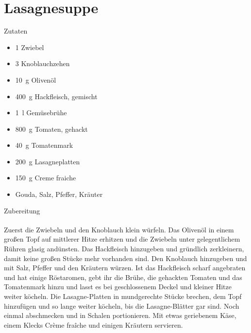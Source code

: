 \section*{Lasagnesuppe}
\ihead{}\ohead{}
\cfoot{}
{\Large Zutaten}
\begin{multicols}{2}
\begin{itemize}
    \item \num{1} Zwiebel 
    \item \num{3} Knoblauchzehen
    \item \SI{10}{g} Olivenöl
    \item \SI{400}{g} Hackfleisch, gemischt
    \item \SI{1}{l} Gemüsebrühe
    \item \SI{800}{g} Tomaten, gehackt
    \item \SI{40}{g} Tomatenmark
    \item \SI{200}{g} Lasagneplatten
    \item \SI{150}{g} Creme fraiche
    \item Gouda, Salz, Pfeffer, Kräuter
\end{itemize}
\end{multicols}
\noindent
{\Large Zubereitung}\\
\\
Zuerst die Zwiebeln und den Knoblauch klein würfeln.
Das Olivenöl in einem großen Topf auf mittlerer Hitze erhitzen und die Zwiebeln unter gelegentlichem Rühren glasig andünsten.
Das Hackfleisch hinzugeben und gründlich zerkleinern, damit keine großen Stücke mehr vorhanden sind.
Den Knoblauch hinzugeben und mit Salz, Pfeffer und den Kräutern würzen.
Ist das Hackfleisch scharf angebraten und hat einige Röstaromen, gebt ihr die Brühe, die gehackten Tomaten und das Tomatenmark hinzu und lasst es bei geschlossenem Deckel und kleiner Hitze weiter köcheln.
Die Lasagne-Platten in mundgerechte Stücke brechen, dem Topf hinzufügen und so lange weiter köcheln, bis die Lasagne-Blätter gar sind.
Noch einmal abschmecken und in Schalen portionieren.
Mit etwas geriebenem Käse, einem Klecks Crème fraîche und einigen Kräutern servieren.
